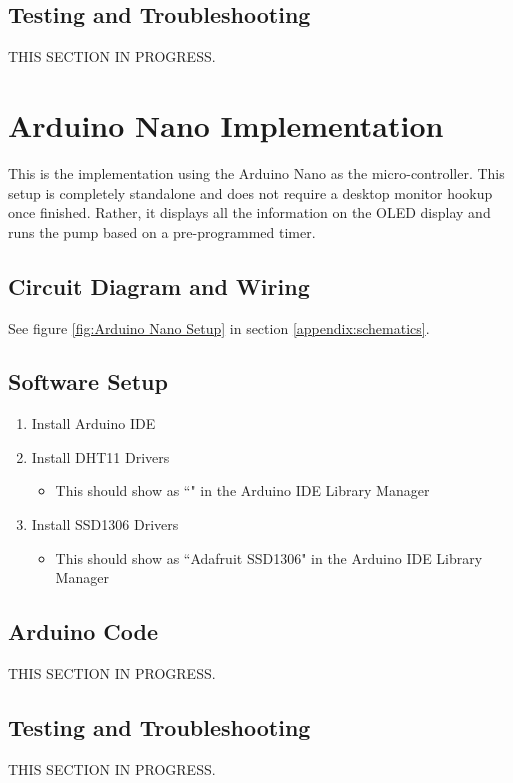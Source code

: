 \documentclass{article}
\begin{document}
\begin{multicols}{2}
			\subsection{Testing and Troubleshooting}
			THIS SECTION IN PROGRESS.
		
		\section{Arduino Nano Implementation}
		This is the implementation using the Arduino Nano as the micro-controller. This setup is completely standalone and does not require a desktop monitor hookup once finished. Rather, it displays all the information on the OLED display and runs the pump based on a pre-programmed timer.
		
			\subsection{Circuit Diagram and Wiring}
			See figure \ref{fig:Arduino Nano Setup} in section \ref{appendix:schematics}.
			
			\subsection{Software Setup}
			\begin{enumerate}
				\item Install Arduino IDE
				\item Install DHT11 Drivers
				\begin{itemize}
					\item This should show as ``" in the Arduino IDE Library Manager
				\end{itemize}
				\item Install SSD1306 Drivers
				\begin{itemize}
					\item This should show as ``Adafruit SSD1306" in the Arduino IDE Library Manager
				\end{itemize}
			\end{enumerate}
			
			\subsection{Arduino Code}
			THIS SECTION IN PROGRESS.
			
			\subsection{Testing and Troubleshooting}
			THIS SECTION IN PROGRESS.
		

\end{multicols}
\end{document}
